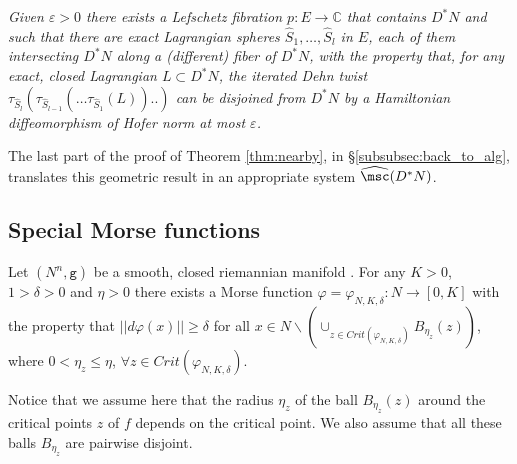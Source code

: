 {\em  Given $\varepsilon >0$ there exists a Lefschetz fibration $p:E\to \mathbb{C}$ that contains $D^{\ast}N$ and such that there are exact Lagrangian spheres $\hat{S}_{1},\ldots, \hat{S}_{l}$ in $E$, each of them intersecting $D^{\ast}N$ along a (different) fiber of $D^{\ast}N$, with the property that, for any exact, closed Lagrangian $L\subset D^{\ast}N$, the iterated Dehn twist $\tau_{\hat{S}_{l}}(\tau_{\hat{S}_{l-1}} (\ldots \tau_{\hat{S}_{1}}(L)).. )$ can be disjoined from $D^{\ast}N$ by a Hamiltonian diffeomorphism of Hofer norm at most $\varepsilon$.}

The last part 
of the proof of Theorem \ref{thm:nearby}, in \S\ref{subsubsec:back_to_alg}, translates this geometric result in an appropriate system  $\widehat{\msc}(D^{\ast}N)$. 

\subsection{Special Morse functions }\label{subsec:Morse}
\begin{prop}\label{prop:Morse}
Let $(N^{n},\mathtt{g})$ be a smooth, closed riemannian manifold . For any $K>0$, $1>\delta >0$ and  
$\eta>0$ there exists a Morse function $\varphi=\varphi_{N, K,\delta}:N\to [0,K]$ with the property
that $ ||d\varphi(x)||\geq\delta$ for all $x\in N\backslash (\cup_{z\in Crit(\varphi_{N, K,\delta})} B_{\eta_{z}}(z))$, where $0<\eta_{z}\leq \eta$, $\forall z\in Crit(\varphi_{N, K,\delta})$.
\end{prop} 
Notice that we assume here that the radius $\eta_{z}$ of the ball $B_{\eta_{z}}(z)$ around 
the critical points $z$ of $f$ depends on the critical point.  We also assume that all these balls $B_{\eta_{z}}$ are pairwise disjoint. 
